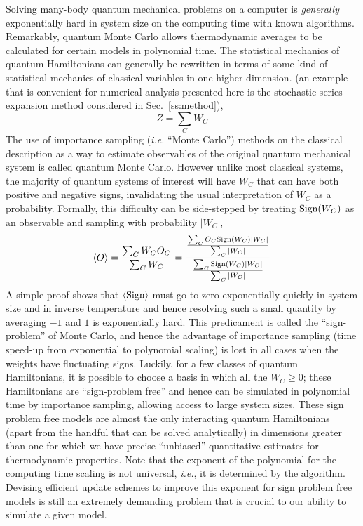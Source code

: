 \documentclass[range]{ar2e}
\begin{document}
Solving many-body quantum mechanical problems on a computer is {\em generally}
exponentially hard in system size on the computing time with known
algorithms. Remarkably, quantum Monte Carlo allows thermodynamic
averages to be calculated for certain models
in polynomial time. The statistical mechanics of quantum Hamiltonians can generally be
rewritten in terms of some kind of statistical mechanics of classical
variables in one higher dimension. (an example that is
convenient for numerical analysis presented here is the stochastic series
expansion method considered in Sec.~\ref{ss:method}),
\begin{equation}
\label{eq:wc}
Z=\sum_C W_C
\end{equation}
 The use of importance sampling ({\em i.e.} ``Monte Carlo'')
methods on the classical description as a way to estimate observables of the
original quantum mechanical system is called
quantum Monte Carlo. However unlike most classical systems, the
majority of
quantum systems of interest will have $W_C$ that can have both
positive and negative signs, invalidating the usual interpretation of
$W_C$ as a probability. Formally, this difficulty can be side-stepped
by treating ${\rm  Sign} (W_C)$ as an observable and sampling with
probability $|W_C|$,
\begin{equation}
\langle O \rangle = \frac{\sum_C W_C O_C}{\sum_C W_C} =
\frac{\frac{\sum_C O_C {\rm Sign}(W_C) |W_C|}{\sum_{C}|W_C|}}{\frac{\sum_C
    {\rm Sign}(W_C)|W_C|}{\sum_{C}|W_C|}}
\end{equation}
A simple proof shows that $\langle {\rm Sign}\rangle$ must go to zero
exponentially quickly in system size and in inverse temperature and hence
resolving such a small quantity by averaging $-1$ and $1$ is
exponentially hard. This predicament is called the ``sign-problem'' of
Monte Carlo, and hence the advantage of importance sampling (time speed-up
from exponential to polynomial scaling) is
lost in all cases when the weights have fluctuating signs. Luckily, for a few classes of quantum Hamiltonians, it is possible to
choose a basis in which all the $W_C\geq 0$; these Hamiltonians are
``sign-problem free'' and hence can be simulated in polynomial time by
importance sampling, allowing access to large system sizes. 
These sign problem free models are almost the only interacting quantum
Hamiltonians (apart from the handful that can be solved analytically) in dimensions greater than one for which we have precise ``unbiased''
quantitative estimates for
thermodynamic properties.  
 Note that the exponent of the polynomial for the computing time
 scaling is not universal, {\em i.e.}, it is
determined by the algorithm. Devising efficient update schemes to
improve this exponent for
sign problem free models
is still an extremely demanding problem that is crucial to our ability to
simulate a given model. 
\end{document}
